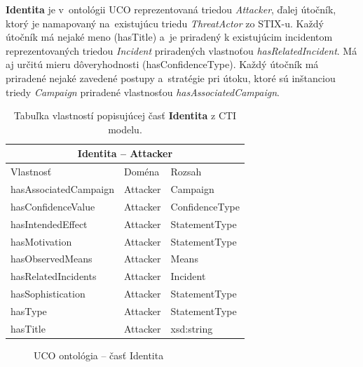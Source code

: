 \documentclass[12pt, a4paper, oneside]{book}
\begin{document}
\textbf{Identita} je v~ontológii UCO reprezentovaná triedou \textit{Attacker}, ďalej útočník, ktorý je namapovaný na~existujúcu triedu \textit{ThreatActor} zo STIX-u.
%
%
Každý útočník má nejaké meno (hasTitle) a~je priradený k existujúcim incidentom reprezentovaných triedou \textit{Incident} priradených vlastnoťou \textit{hasRelatedIncident}. Má aj určitú mieru dôveryhodnosti (hasConfidenceType). Každý útočník má priradené nejaké zavedené postupy a~stratégie pri útoku, ktoré sú inštanciou triedy \textit{Campaign} priradené vlastnosťou \textit{hasAssociatedCampaign}.
%
%
\begin{table}[hbt!]
\centering
\begin{tabular}{ |p{5cm}||p{3cm}|p{3cm}|  }
 \hline
 \multicolumn{3}{|c|}{Identita -- Attacker} \\
 \hline
 Vlastnosť & Doména & Rozsah\\
 \hline
 hasAssociatedCampaign & Attacker & Campaign\\
 hasConfidenceValue & Attacker & ConfidenceType\\
 hasIntendedEffect & Attacker & StatementType\\
 hasMotivation & Attacker & StatementType\\
 hasObservedMeans & Attacker & Means\\
 hasRelatedIncidents & Attacker & Incident\\
 hasSophistication & Attacker & StatementType\\
 hasType & Attacker & StatementType\\
 hasTitle & Attacker & xsd:string\\
 \hline
\end{tabular}
\caption{Tabuľka vlastností popisujúcej časť \textbf{Identita} z CTI modelu.}
\label{tab:template}
\end{table}
\begin{figure}[!hb]
\label{fig:ucoIdentita}
\caption{UCO ontológia -- časť Identita}
\end{figure}
\end{document}
